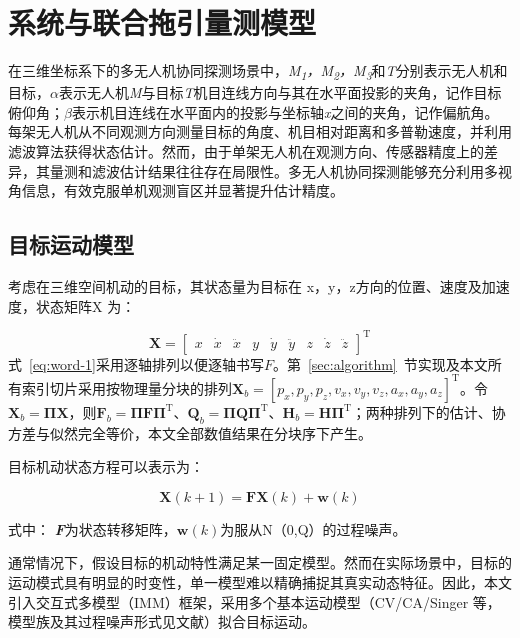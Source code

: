 \documentclass[UTF8,a4paper,zihao=-4]{ctexart}
\begin{document}
\section{系统与联合拖引量测模型}\label{sec:model}
在三维坐标系下的多无人机协同探测场景中，\emph{M\textsubscript{1}，M\textsubscript{2}，M\textsubscript{3}}和\emph{T}分别表示无人机和目标，\emph{\ensuremath{\alpha}}表示无人机\emph{M}与目标\emph{T}机目连线方向与其在水平面投影的夹角，记作目标俯仰角；\emph{\ensuremath{\beta}}表示机目连线在水平面内的投影与坐标轴\emph{x}之间的夹角，记作偏航角。每架无人机从不同观测方向测量目标的角度、机目相对距离和多普勒速度，并利用滤波算法获得状态估计。然而，由于单架无人机在观测方向、传感器精度上的差异，其量测和滤波估计结果往往存在局限性。多无人机协同探测能够充分利用多视角信息，有效克服单机观测盲区并显著提升估计精度。

\subsection{目标运动模型}\label{sec:motion}

考虑在三维空间机动的目标，其状态量为目标在
x，y，z方向的位置、速度及加速度，状态矩阵X 为：


\begin{equation}
\mathbf{X}=\begin{bmatrix}x&\dot{x}&\ddot{x}&y&\dot{y}&\ddot{y}&z&\dot{z}&\ddot{z}\end{bmatrix}^{\mathrm T}
\label{eq:word-1}
\end{equation}
式~\eqref{eq:word-1}采用逐轴排列以便逐轴书写\(F\)。第~\ref{sec:algorithm}~节实现及本文所有索引切片采用按物理量分块的排列\(\boldsymbol X_b=[p_x,p_y,p_z,v_x,v_y,v_z,a_x,a_y,a_z]^{\mathrm T}\)。令\(\boldsymbol X_b=\boldsymbol\Pi\boldsymbol X\)，则\(\boldsymbol F_b=\boldsymbol\Pi\boldsymbol F\boldsymbol\Pi^{\mathrm T}\)、\(\boldsymbol Q_b=\boldsymbol\Pi\boldsymbol Q\boldsymbol\Pi^{\mathrm T}\)、\(\boldsymbol H_b=\boldsymbol H\boldsymbol\Pi^{\mathrm T}\)；两种排列下的估计、协方差与似然完全等价，本文全部数值结果在分块序下产生。


目标机动状态方程可以表示为：


\begin{equation}
\mathbf{X}(k+1)=\mathbf{F}\mathbf{X}(k)+\mathbf{w}(k)
\label{eq:word-2}
\end{equation}


式中：
\emph{\textbf{F}}为状态转移矩阵，\(\mathbf{w}(k)\)为服从N（0,Q）的过程噪声。

通常情况下，假设目标的机动特性满足某一固定模型。然而在实际场景中，目标的运动模式具有明显的时变性，单一模型难以精确捕捉其真实动态特征。因此，本文引入交互式多模型（IMM）框架\cite{blom1988}，采用多个基本运动模型（CV/CA/Singer 等，模型族及其过程噪声形式见文献\cite{li2003,singer1970}）拟合目标运动。
\end{document}
